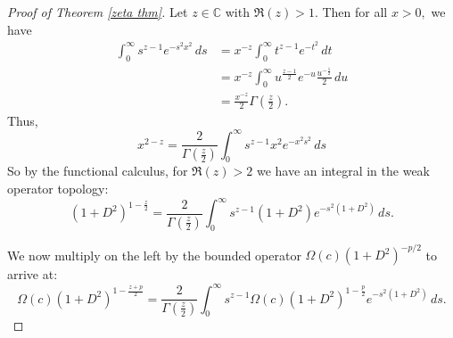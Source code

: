     \begin{proof}[Proof of Theorem \ref{zeta thm}] 
        Let $z \in \mathbb{C}$ with $\Re(z) > 1$. Then for all $x>0,$ we have
        \begin{align*}
            \int_0^{\infty}s^{z-1}e^{-s^2x^2}\,ds &= x^{-z}\int_0^\infty t^{z-1}e^{-t^2}\,dt\\
                                                  &= x^{-z}\int_0^\infty u^{\frac{z-1}{2}}e^{-u}\frac{u^{-\frac{1}{2}}}{2}\,du\\
                                                  &= \frac{x^{-z}}{2}\Gamma\left(\frac{z}{2}\right).
        \end{align*}
        Thus,
        \begin{equation*}
            x^{2-z} = \frac{2}{\Gamma\left(\frac{z}{2}\right)}\int_0^\infty s^{z-1}x^2e^{-x^2s^2}\,ds
        \end{equation*}
        So by the functional calculus, for $\Re(z) > 2$ we have an integral in the weak operator topology:
        \begin{equation*}
            (1+D^2)^{1-\frac{z}{2}} = \frac{2}{\Gamma\left(\frac{z}{2}\right)}\int_0^{\infty}s^{z-1}(1+D^2)e^{-s^2(1+D^2)}\,ds.
        \end{equation*}        
        
        We now multiply on the left by the bounded operator $\Omega(c)(1+D^2)^{-p/2}$ to arrive at:
        \begin{equation*}
            \Omega(c)(1+D^2)^{1-\frac{z+p}{2}} = \frac{2}{\Gamma\left(\frac{z}{2}\right)}\int_0^\infty s^{z-1}\Omega(c)(1+D^2)^{1-\frac{p}{2}}e^{-s^2(1+D^2)}\,ds.
        \end{equation*}
              

\end{proof}
